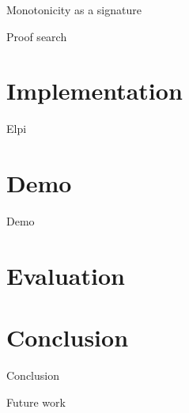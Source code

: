 \documentclass[aspectratio=169]{beamer}
\begin{document}
\begin{frame}{Monotonicity as a signature}

\end{frame}

\begin{frame}{Proof search}

\end{frame}

\section{Implementation}

\begin{frame}{Elpi}

\end{frame}



\section{Demo}
\begin{frame}{Demo}

\end{frame}

\section{Evaluation}

\section{Conclusion}
\begin{frame}{Conclusion}

\end{frame}

\begin{frame}{Future work}

\end{frame}
\end{document}
